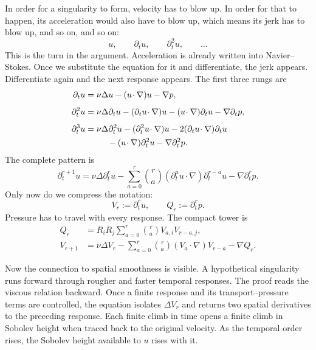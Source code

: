 In order for a singularity to form, velocity has to blow up.  In order for
that to happen, its acceleration would also have to blow up, which means its
jerk has to blow up, and so on, and so on:
\[
u,\qquad \partial_tu,\qquad \partial_t^2u,\qquad\ldots
\]
This is the turn in the argument.  Acceleration is already written into
Navier--Stokes.  Once we substitute the equation for it and differentiate, the
jerk appears.  Differentiate again and the next response appears.  The first
three rungs are
\[
\begin{aligned}
\partial_tu
&=\nu\Delta u-(u\!\cdot\nabla)u-\nabla p,\\[4pt]
\partial_t^2u
&=\nu\Delta\partial_tu
  -(\partial_tu\!\cdot\nabla)u
  -(u\!\cdot\nabla)\partial_tu
  -\nabla\partial_tp,\\[4pt]
\partial_t^3u
&=\nu\Delta\partial_t^2u
  -(\partial_t^2u\!\cdot\nabla)u
  -2(\partial_tu\!\cdot\nabla)\partial_tu\\
&\hspace{2.6em}
  -(u\!\cdot\nabla)\partial_t^2u
  -\nabla\partial_t^2p.
\end{aligned}
\]
The complete pattern is
\[
\partial_t^{r+1}u
=\nu\Delta\partial_t^ru
-\sum_{a=0}^{r}\binom ra
  (\partial_t^au\!\cdot\nabla)\partial_t^{r-a}u
-\nabla\partial_t^rp.
\]
Only now do we compress the notation:
\[
V_r:=\partial_t^ru,
\qquad
Q_r:=\partial_t^rp.
\]
Pressure has to travel with every response.  The compact tower is
\[
\begin{aligned}
Q_r
&=R_iR_j\sum_{a=0}^{r}\binom ra V_{a,i}V_{r-a,j},\\
V_{r+1}
&=\nu\Delta V_r
  -\sum_{a=0}^{r}\binom ra(V_a\!\cdot\nabla)V_{r-a}
  -\nabla Q_r.
\end{aligned}
\]

Now the connection to spatial smoothness is visible.  A hypothetical
singularity runs forward through rougher and faster temporal responses.  The
proof reads the viscous relation backward.  Once a finite response and its
transport--pressure terms are controlled, the equation isolates
\(\Delta V_r\) and returns two spatial derivatives to the preceding response.
Each finite climb in time opens a finite climb in Sobolev height when traced
back to the original velocity.  As the temporal order rises, the Sobolev
height available to \(u\) rises with it.

